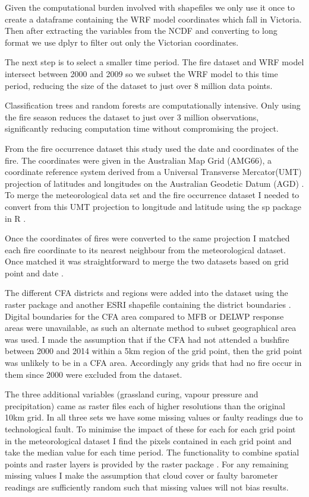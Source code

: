 \documentclass[11pt,a4paper]{article}
\begin{document}
	Given the computational burden involved with shapefiles we only use it once to create a dataframe containing the WRF model coordinates which fall in Victoria. Then after extracting the variables from the NCDF and converting to long format we use dplyr to filter out only the Victorian coordinates. 
	
	The next step is to select a smaller time period. The fire dataset and WRF model intersect between 2000 and 2009 so we subset the WRF model to this time period, reducing the size of the dataset to just over 8 million data points. 
	
 \sec
	
	Classification trees and random forests are computationally intensive. Only using the fire season reduces the dataset to just over 3 million observations, significantly reducing computation time without compromising the project. 
	
	From the fire occurrence dataset this study used the date and coordinates of the fire. The coordinates were given in the Australian Map Grid (AMG66), a coordinate reference system derived from a Universal Transverse Mercator(UMT) projection of latitudes and longitudes on the Australian Geodetic Datum (AGD) \citep{featherstone96}. To merge the meteorological data set and the fire occurrence dataset I needed to convert from this UMT projection to longitude and latitude using the sp package in R \citep{sp08}. 
	
	Once the coordinates of fires were converted to the same projection I matched each fire coordinate to its nearest neighbour from the meteorological dataset. Once matched it was straightforward to merge the two datasets based on grid point and date \citep{datatable}. 
	
	The different CFA districts and regions were added into the dataset using the raster package and another ESRI shapefile containing the district boundaries \citep{raster}. 
	Digital boundaries for the CFA area compared to MFB or DELWP response areas were unavailable, as such an alternate method to subset geographical area was used. I made the assumption that if the CFA had not attended a bushfire between 2000 and 2014 within a 5km region of the grid point, then the grid point was unlikely to be in a CFA area. Accordingly any grids that had no fire occur in them since 2000 were excluded from the dataset. 
	
	The three additional variables (grassland curing, vapour pressure and precipitation) came as raster files each of higher resolutions than the original 10km grid. In all three sets we have some missing values or faulty readings due to technological fault. To minimise the impact of these for each for each grid point in the meteorological dataset I find the pixels contained in each grid point and take the median value for each time period. The functionality to combine spatial points and raster layers is provided by the raster package \citep{raster}. For any remaining missing values I make the assumption that cloud cover or faulty barometer readings are sufficiently random such that missing values will not bias results.
	
\end{document}
